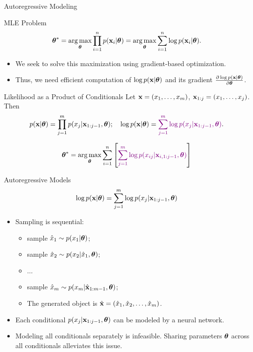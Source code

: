 \documentclass{beamer}
\begin{document}
\begin{frame}{Autoregressive Modeling}
    \begin{block}{MLE Problem}
	    \vspace{-0.4cm}
	    $$
	        \boldsymbol{\theta}^* = \operatorname*{arg\,max}_{\boldsymbol{\theta}} \prod_{i=1}^n p(\mathbf{x}_i | \boldsymbol{\theta}) = \operatorname*{arg\,max}_{\boldsymbol{\theta}} \sum_{i=1}^n \log p(\mathbf{x}_i | \boldsymbol{\theta}).
	    $$
	    \vspace{-0.5cm}
    \end{block}
    \begin{itemize}
        \item We seek to solve this maximization using gradient-based optimization.
        \item Thus, we need efficient computation of $\log p(\mathbf{x} | \boldsymbol{\theta})$ and its gradient $\frac{\partial \log p(\mathbf{x} | \boldsymbol{\theta})}{\partial \boldsymbol{\theta}}$.
    \end{itemize}
    \begin{block}{Likelihood as a Product of Conditionals}
    Let $\mathbf{x} = (x_1, \dots, x_m)$, $\mathbf{x}_{1:j} = (x_1, \dots, x_j)$. Then 
    $$
        p(\mathbf{x} | \boldsymbol{\theta}) = \prod_{j=1}^m p(x_j | \mathbf{x}_{1:j - 1}, \boldsymbol{\theta}); \quad 
        \log p(\mathbf{x} | \boldsymbol{\theta}) = {\color{violet}\sum_{j=1}^m \log p(x_j | \mathbf{x}_{1:j - 1}, \boldsymbol{\theta})}.
    $$
    \end{block}
    \vspace{-0.5cm}
	 $$
	     \boldsymbol{\theta}^* =  \operatorname*{arg\,max}_{\boldsymbol{\theta}} \sum_{i=1}^n \left[{\color{violet} \sum_{j=1}^m \log p(x_{ij} | \mathbf{x}_{i, 1:j - 1}, \boldsymbol{\theta})}\right]
	 $$
\end{frame}
\begin{frame}{Autoregressive Models}
    $$
    \log p(\mathbf{x}| \boldsymbol{\theta}) = \sum_{j=1}^m \log p(x_j | \mathbf{x}_{1:j - 1}, \boldsymbol{\theta})
    $$
    \begin{itemize}
	    \item Sampling is sequential:
	    \begin{itemize}
    		\item sample $\hat{x}_1 \sim p(x_1 | \boldsymbol{\theta})$;
    		\item sample $\hat{x}_2 \sim p(x_2 | \hat{x}_1, \boldsymbol{\theta})$;
    		\item $\dots$
    		\item sample $\hat{x}_m \sim p(x_m | \hat{\mathbf{x}}_{1:m-1}, \boldsymbol{\theta})$;
    		\item The generated object is $\hat{\mathbf{x}} = (\hat{x}_1, \hat{x}_2, \dots, \hat{x}_m)$.
    	\end{itemize}
        \item Each conditional $p(x_j | \mathbf{x}_{1:j - 1}, \boldsymbol{\theta})$ can be modeled by a neural network.
        \item Modeling all conditionals separately is infeasible. Sharing parameters $\boldsymbol{\theta}$ across all conditionals alleviates this issue.
    \end{itemize}
\end{frame}
\end{document}
